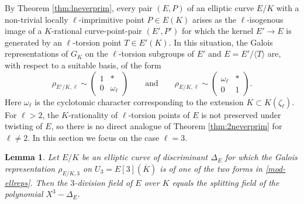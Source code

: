 \documentclass{amsart}
\theoremstyle{plain}
\newtheorem{lemma}[theorem]{Lemma}
\theoremstyle{definition}
\begin{document}
\noindent
By Theorem \ref{thm:lneverprim}, every pair $(E,P)$ of an
elliptic curve $E/K$ with a non-trivial locally $\ell$-imprimitive point $P\in E(K)$ arises as the $\ell$-isogenous image of a $K$-rational 
curve-point-pair $(E',P')$ for which the kernel $E'\to E$ 
is generated by an $\ell$-torsion point $T\in E'(K)$.
In this situation,  
the Galois representations of $G_K$ on the $\ell$-torsion subgroups  
of $E'$ and $E=E'/\langle T\rangle$ are, 
with respect to a suitable basis, of the form 
\begin{equation}
\label{mod-ellreps}
\rho_{E'/K,\ell} \sim 
\begin{pmatrix}
1 & *  \\
0 & \omega_\ell  
\end{pmatrix}
\qquad\text{and}\qquad
\rho_{E/K,\ell} \sim 
\begin{pmatrix}
\omega_\ell & *  \\
0 & 1  
\end{pmatrix}.
\end{equation}
Here $\omega_\ell$ is the cyclotomic character corresponding to 
the extension $K\subset K(\zeta_\ell)$.
For $\ell > 2$, the $K$-rationality of $\ell$-torsion points of $E$
is not preserved under twisting of $E$, so there is no direct analogue of
Theorem \ref{thm:2neverprim} for $\ell\ne2$.
In this section we focus on the case $\ell=3$.
\begin{lemma}
\label{K3-cuberootdisc}
Let $E/K$ be an elliptic curve of discriminant $\Delta_{E}$
for which the Galois representation
$\rho_{E/K, 3}$ on $U_3=E[3](\overline K)$ is of one of the two forms in 
\eqref{mod-ellreps}.
Then the $3$-division field of $E$ over $K$ equals the splitting field 
of the polynomial $X^3-\Delta_{E}$.
\end{lemma}
\end{document}
